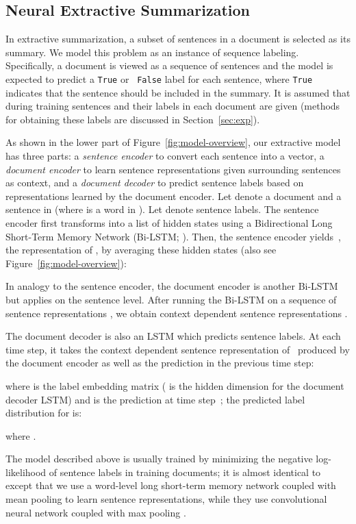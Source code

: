 \documentclass[11pt,a4paper]{article}
\begin{document}
\subsection{Neural Extractive Summarization}
\label{sec:extract_sum}
In extractive summarization, a subset of sentences in a document is
selected as its summary. We model this problem as an instance of
sequence labeling. Specifically, a document is viewed as a sequence of
sentences and the model is expected to predict a {\tt True} or {\tt
  False} label for each sentence, where {\tt True} indicates that the
sentence should be included in the summary. It is assumed that during
training sentences and their labels in each document are given
(methods for obtaining these labels are discussed in
Section~\ref{sec:exp}).

As shown in the lower part of Figure~\ref{fig:model-overview}, our
extractive model has three parts: a \emph{sentence encoder} to convert
each sentence into a vector, a \emph{document encoder} to learn
sentence representations given surrounding sentences as context, and a
\emph{document decoder} to predict sentence labels based on
representations learned by the {document encoder}. Let
 denote a document
and  a sentence in
 (where  is a word in ). Let  denote sentence labels. The {sentence encoder}
first transforms  into a list of hidden states  using a Bidirectional
Long Short-Term Memory Network (Bi-LSTM;
\citealt{hochreiter:1997:nc,schuster:1997:tsp}). Then, the {sentence
  encoder} yields~, the representation of , by
averaging these hidden states (also see
Figure~\ref{fig:model-overview}):


In analogy to the {sentence encoder}, the {document encoder} is
another Bi-LSTM but applies on the sentence level. After running the
Bi-LSTM on a sequence of sentence representations , we obtain 
context dependent sentence representations .

The document decoder is also an LSTM which predicts sentence
labels. At each time step, it takes the context dependent sentence
representation of~ produced by the document encoder as
well as the prediction in the previous time step:

where  is the label
embedding matrix ( is the hidden dimension for the document decoder
LSTM) and  is the prediction at time step~; the
predicted label distribution for  is:

where .

The model described above is usually trained by minimizing the
negative log-likelihood of sentence labels in training documents; it
is almost identical to  except that we use a
word-level long short-term memory network coupled with mean pooling to
learn sentence representations, while they use convolutional neural
network coupled with max pooling \cite{kim:2016:aaai}.
\end{document}

